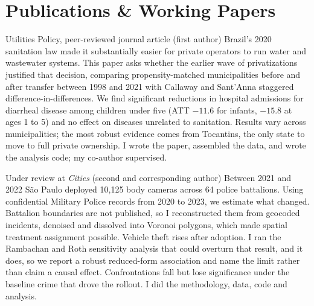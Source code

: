 \section{Publications \& Working Papers}

      {Utilities Policy, peer-reviewed journal article \textnormal{(first author)}}
      {Brazil's 2020 sanitation law made it substantially easier for private operators to run water and wastewater systems. This paper asks whether the earlier wave of privatizations justified that decision, comparing propensity-matched municipalities before and after transfer between 1998 and 2021 with Callaway and Sant'Anna staggered difference-in-differences. We find significant reductions in hospital admissions for diarrheal disease among children under five (ATT $-11.6$ for infants, $-15.8$ at ages 1 to 5) and no effect on diseases unrelated to sanitation. Results vary across municipalities; the most robust evidence comes from Tocantins, the only state to move to full private ownership. I wrote the paper, assembled the data, and wrote the analysis code; my co-author supervised.}

      {Under review at \textit{Cities} \textnormal{(second and corresponding author)}}
      {Between 2021 and 2022 São Paulo deployed 10,125 body cameras across 64 police battalions. Using confidential Military Police records from 2020 to 2023, we estimate what changed. Battalion boundaries are not published, so I reconstructed them from geocoded incidents, denoised and dissolved into Voronoi polygons, which made spatial treatment assignment possible. Vehicle theft rises after adoption. I ran the Rambachan and Roth sensitivity analysis that could overturn that result, and it does, so we report a robust reduced-form association and name the limit rather than claim a causal effect. Confrontations fall but lose significance under the baseline crime that drove the rollout. I did the methodology, data, code and analysis.}
